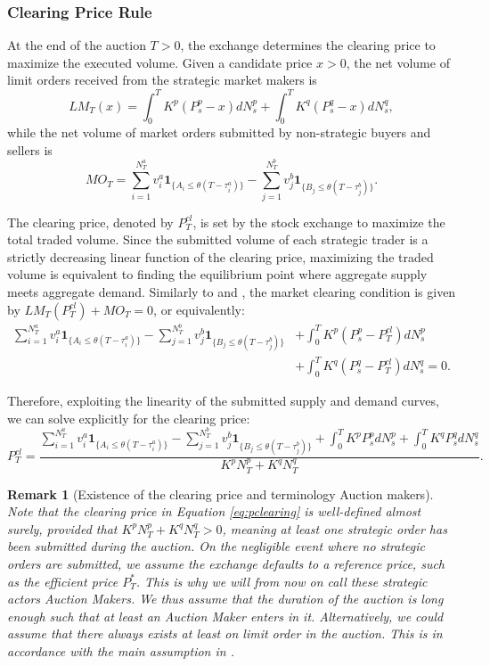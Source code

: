 \documentclass[12pt]{article}
\newtheorem{remark}[theorem2]{Remark}
\begin{document}
\subsubsection{Clearing Price Rule}

At the end of the auction $T>0$, the exchange determines the clearing price to maximize the executed volume. Given a candidate price $x > 0$, the net volume of limit orders received from the strategic market makers is
\[ LM_T(x) = \int_0^T K^p(P_s^p - x)dN_s^p + \int_0^T K^q(P_s^q - x)dN_s^q, \]
while the net volume of market orders submitted by non-strategic buyers and sellers is
\[ MO_T = \sum_{i=1}^{N_T^a}v_i^a \mathbf{1}_{\{A_i \leq \theta(T-\tau^a_i)\}} - \sum_{j=1}^{N_T^b}v_j^b \mathbf{1}_{\{B_j \leq \theta(T-\tau^b_j)\}}. \]

The clearing price, denoted by $P^{cl}_T$, is set by the stock exchange to maximize the total traded volume. Since the submitted volume of each strategic trader is a strictly decreasing linear function of the clearing price, maximizing the traded volume is equivalent to finding the equilibrium point where aggregate supply meets aggregate demand. Similarly to \cite{du2017optimal} and \cite[Section 2.3]{paul2021optimal}, the market clearing condition is given by $LM_T(P^{cl}_T) + MO_T = 0$, or equivalently:
\begin{align*}
    \sum_{i=1}^{N_T^a} v^a_i \mathbf{1}_{\{A_i \leq \theta(T - \tau^a_i)\}} - \sum_{j=1}^{N_T^b} v^b_j \mathbf{1}_{\{B_j \leq \theta(T - \tau^b_j)\}} &+ \int_0^T K^p(P^{p}_s - P^{cl}_T ) dN^{p}_s \\
    &+ \int_0^T K^q(P^{q}_s - P^{cl}_T ) dN^{q}_s = 0.
\end{align*}

Therefore, exploiting the linearity of the submitted supply and demand curves, we can solve explicitly for the clearing price:
\begin{equation}
    P^{cl}_T = \frac{\sum_{i=1}^{N_T^a} v^a_i \mathbf{1}_{\{A_i \leq \theta(T - \tau^a_i)\}} - \sum_{j=1}^{N_T^b} v^b_j \mathbf{1}_{\{B_j \leq \theta(T - \tau^b_j)\}} + \int_0^T K^p P^{p}_s dN^{p}_s + \int_0^T K^q P^{q}_s dN^{q}_s} {K^p N^{p}_T + K^q N^{q}_T}.
    \label{eq:pclearing}
\end{equation}

\begin{remark}[Existence of the clearing price and terminology Auction makers]\label{rem:existencecp}
Note that the clearing price in Equation \eqref{eq:pclearing} is well-defined almost surely, provided that $K^p N^{p}_T + K^q N^{q}_T > 0$, meaning at least one strategic order has been submitted during the auction. On the negligible event where no strategic orders are submitted, we assume the exchange defaults to a reference price, such as the efficient price $P^*_T$. This is why we will from now on call these strategic actors Auction Makers. We thus assume that the duration of the auction is long enough such that at least an Auction Maker enters in it. Alternatively, we could assume that there always exists at least on limit order in the auction. This is in accordance with the main assumption in \cite{paul2021optimal}.
\end{remark}
\end{document}
